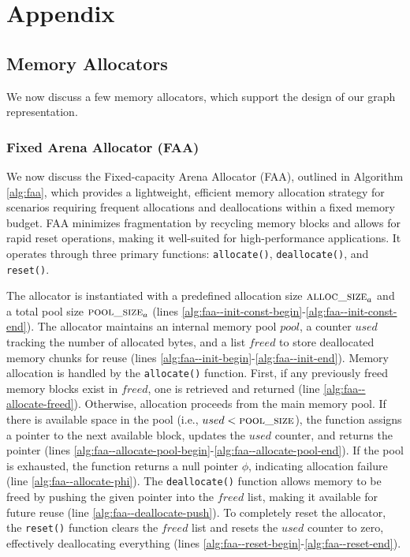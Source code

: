 \section{Appendix}

\subsection{Memory Allocators}
\label{sec:memory-allocators}

We now discuss a few memory allocators, which support the design of our graph representation.




\subsubsection{Fixed Arena Allocator (FAA)}
\label{sec:faa}

We now discuss the Fixed-capacity Arena Allocator (FAA), outlined in Algorithm \ref{alg:faa}, which provides a lightweight, efficient memory allocation strategy for scenarios requiring frequent allocations and deallocations within a fixed memory budget. FAA minimizes fragmentation by recycling memory blocks and allows for rapid reset operations, making it well-suited for high-performance applications. It operates through three primary functions: \texttt{allocate()}, \texttt{deallocate()}, and \texttt{reset()}.

The allocator is instantiated with a predefined allocation size $\textsc{alloc\_size}_a$ and a total pool size $\textsc{pool\_size}_a$ (lines \ref{alg:faa--init-const-begin}-\ref{alg:faa--init-const-end}). The allocator maintains an internal memory pool $pool$, a counter $used$ tracking the number of allocated bytes, and a list $freed$ to store deallocated memory chunks for reuse (lines \ref{alg:faa--init-begin}-\ref{alg:faa--init-end}). Memory allocation is handled by the \texttt{allocate()} function. First, if any previously freed memory blocks exist in $freed$, one is retrieved and returned (line \ref{alg:faa--allocate-freed}). Otherwise, allocation proceeds from the main memory pool. If there is available space in the pool (i.e., $used < \textsc{pool\_size}$), the function assigns a pointer to the next available block, updates the $used$ counter, and returns the pointer (lines \ref{alg:faa--allocate-pool-begin}-\ref{alg:faa--allocate-pool-end}). If the pool is exhausted, the function returns a null pointer $\phi$, indicating allocation failure (line \ref{alg:faa--allocate-phi}). The \texttt{deallocate()} function allows memory to be freed by pushing the given pointer into the $freed$ list, making it available for future reuse (line \ref{alg:faa--deallocate-push}). To completely reset the allocator, the \texttt{reset()} function clears the $freed$ list and resets the $used$ counter to zero, effectively deallocating everything (lines \ref{alg:faa--reset-begin}-\ref{alg:faa--reset-end}).


